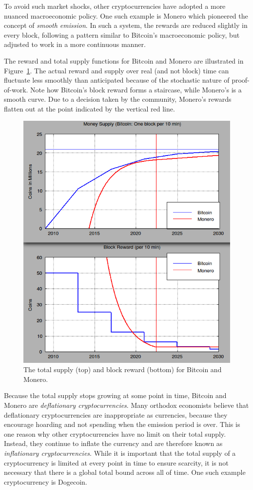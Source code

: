 To avoid such market shocks, other cryptocurrencies have adopted a more
nuanced macroeconomic policy. One such example is Monero which pioneered
the concept of \emph{smooth emission}. In such a system, the rewards
are reduced slightly in every block, following a pattern similar to
Bitcoin's macroeconomic policy, but adjusted to work in a more continuous
manner.

The reward and total supply functions for Bitcoin and Monero are
illustrated in Figure~\ref{fig.macroeconomics}. The actual
reward and supply over real (and not block) time can fluctuate less smoothly
than anticipated because of the stochastic nature of proof-of-work.
Note how Bitcoin's block reward forms a staircase, while Monero's
is a smooth curve. Due to a decision taken by the community, Monero's rewards
flatten out at the point indicated by the vertical red line.

\begin{figure}[h]
  \centering
  \includegraphics[width=0.8 \columnwidth,keepaspectratio]{figures/macroeconomics.png}
  \caption{The total supply (top) and block reward (bottom) for Bitcoin and Monero.}
  \label{fig.macroeconomics}
\end{figure}

Because the total supply stops growing at some point in time, Bitcoin
and Monero are \emph{deflationary cryptocurrencies}. Many orthodox
economists believe that deflationary cryptocurrencies are inappropriate
as currencies, because they encourage hoarding and not spending when
the emission period is over. This is one reason why other cryptocurrencies
have no limit on their total supply. Instead, they continue to inflate
the currency and are therefore known as \emph{inflationary cryptocurrencies}.
While it is important that the total supply of a cryptocurrency is limited
at every point in time to ensure scarcity, it is not necessary that there
is a global total bound across all of time. One such example cryptocurrency
is Dogecoin.

